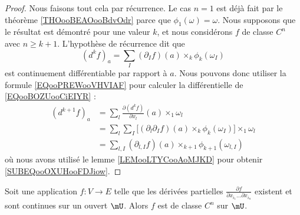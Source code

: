 \begin{proof}
    Nous faisons tout cela par récurrence. Le cas \( n=1\) est déjà fait par le théorème \ref{THOooBEAOooBdvOdr} parce que \( \phi_1(\omega)=\omega\). Nous supposons que le résultat est démontré pour une valeur \( k\), et nous considérons \( f\) de classe \( C^n\) avec \( n\geq k+1\). L'hypothèse de récurrence dit que
    \begin{equation}        \label{EQooBOZUooCiEIYR}
        (d^kf)_a=\sum_{I}(\partial_{I}f)(a)\times_k\phi_k(\omega_{I})
    \end{equation}
    est continuement différentiable par rapport à \( a\). Nous pouvons donc utiliser la formule \eqref{EQooPREWooVHVIAF} pour calculer la différentielle de \eqref{EQooBOZUooCiEIYR} :
    \begin{subequations}
        \begin{align}
            (d^{k+1}f)_a&=\sum_l\frac{ \partial (d^kf) }{ \partial x_l }(a)\times_1\omega_l\\
            &=\sum_l\sum_{I}\big[ (\partial_l\partial_{I}f)(a)\times_k\phi_k(\omega_{I}) \big]\times_1\omega_l\\
            &=\sum_{l,I}(\partial_{l,I}f)(a)\times_{k+1}\phi_{k+1}(\omega_{l,I})        \label{SUBEQooOXUHooFDJiow}
        \end{align}
    \end{subequations}
    où nous avons utilisé le lemme \ref{LEMooLTYCooAoMJKD} pour obtenir \eqref{SUBEQooOXUHooFDJiow}.
\end{proof}

\begin{proposition}     \label{PROPooKOBVooQhrAeJ}
    Soit une application \( f\colon V\to E\) telle que les dérivées partielles \( \frac{ \partial f }{ \partial x_{i_1}\ldots \partial x_{i_n} }\) existent et sont continues sur un ouvert \( \mU\). Alors \( f\) est de classe \( C^n\) sur \( \mU\).
\end{proposition}

